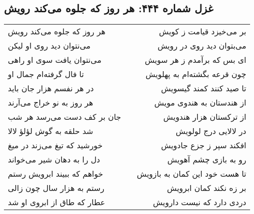 \begin{center}
\section*{غزل شماره ۴۴۴: هر روز که جلوه می‌کند رویش}
\label{sec:444}
\begin{longtable}{l p{0.5cm} r}
هر روز که جلوه می‌کند رویش
&&
بر می‌خیزد قیامت ز کویش
\\
می‌نتوان دید روی او لیکن
&&
می‌بتوان دید روی در رویش
\\
می‌نتوان یافت سوی او راهی
&&
ای بس که برآمدم ز هر سویش
\\
تا فال گرفته‌ام جمال او
&&
چون قرعه بگشته‌ام به پهلویش
\\
در هر نفسم هزار جان باید
&&
تا صید کنند کمند گیسویش
\\
هر روز به نو خراج می‌آرند
&&
از هندستان به هندوی مویش
\\
جان بر کف دست می‌رسد هر شب
&&
از ترکستان هزار هندویش
\\
شد حلقه به گوش لؤلؤ لالا
&&
در لالایی درج لولویش
\\
خورشید که تیغ می‌زند در میغ
&&
افکند سپر ز جزع جادویش
\\
دل را به دهان شیر می‌خواند
&&
رو به بازی چشم آهویش
\\
خواهم که ببیند ابرویش رستم
&&
تا هست خود این کمان به بازویش
\\
رستم به هزار سال چون زالی
&&
بر زه نکند کمان ابرویش
\\
عطار که طاق از ابروی او شد
&&
دردی دارد که نیست دارویش
\\
\end{longtable}
\end{center}
